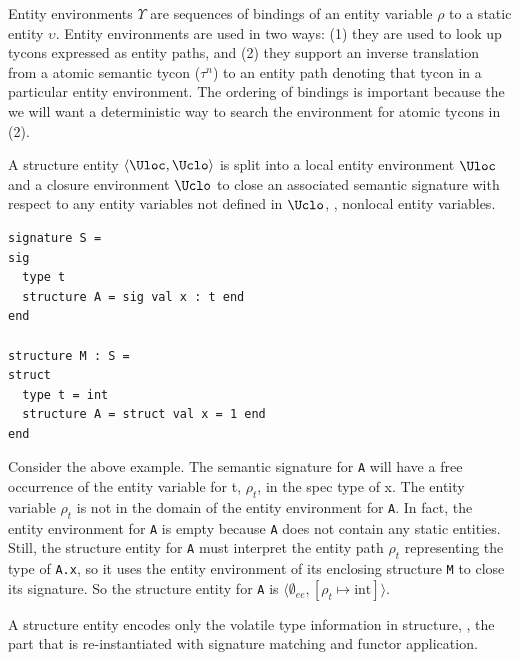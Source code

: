 \documentclass[9pt,nocopyrightspace, fleqn]{sigplanconf}
\begin{document}

 
Entity environments $\Upsilon$ are sequences of bindings of an entity
variable $\rho$ to a static entity $\upsilon$. Entity environments are
used in two ways: (1) they are used to look up tycons expressed as
entity paths, and (2) they support an inverse translation from a atomic
semantic tycon ($\tau^n$) to an entity path denoting that tycon in 
a particular entity environment. The ordering of bindings is important because
the we will want a deterministic way to search the environment for
atomic tycons in (2).
    
A structure entity $\langle \Uloc,\Uclo \rangle$ is split into a local entity
environment $\Uloc$ and a closure environment $\Uclo$ to close an
associated semantic signature with respect to any entity variables not
defined in $\Uclo$, \ie, nonlocal entity variables.
\begin{lstlisting}
signature S = 
sig
  type t
  structure A = sig val x : t end
end

structure M : S =
struct
  type t = int
  structure A = struct val x = 1 end
end
\end{lstlisting}
Consider the above example. The semantic signature for \texttt{A} will
have a free occurrence of the entity variable for t, $\rho_t$, in the
spec type of x. The entity variable $\rho_t$ is not in the domain of
the entity environment for \texttt{A}. In fact, the entity environment
for \texttt{A} is empty because \texttt{A} does not contain any static
entities. Still, the structure entity for \texttt{A} must interpret
the entity path $\rho_t$ representing the type of \texttt{A.x}, so it
uses the entity environment of its enclosing structure \texttt{M} to
close its signature. So the structure entity for \texttt{A} is
$\langle \emptyset_{ee}, [\rho_t \mapsto \mathrm{int}] \rangle$.

A structure entity encodes only the volatile type information in
structure, \ie, the part that is re-instantiated with signature
matching and functor application. 
\end{document}

